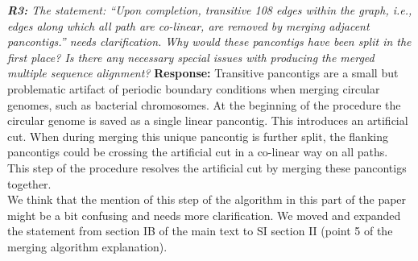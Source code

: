 \documentclass[aps,rmp,onecolumn]{revtex4-1}
\newcommand{\Marco}[1]{{\color{orange}Marco: #1}}
\newcommand{\Liam}[1]{{\color{teal}Liam: #1}}
\newcommand{\reviewer}[2]{{\it \textbf{#1:} #2\vskip 5mm}}
\newcommand{\response}[1]{{{\color{response}\textbf{Response:} #1}}\vskip 5mm}
\newcommand{\SIalgo}{II}
\begin{document}
\reviewer{R3}{The statement: ``Upon completion, transitive 108 edges within the graph, i.e., edges along which all path are co-linear, are removed by merging adjacent pancontigs.'' needs clarification. Why would these pancontigs have been split in the first place? Is there any necessary special issues with producing the merged multiple sequence alignment?}
\response{Transitive pancontigs are a small but problematic artifact of periodic boundary conditions when merging circular genomes, such as bacterial chromosomes. At the beginning of the procedure the circular genome is saved as a single linear pancontig. This introduces an artificial cut. When during merging this unique pancontig is further split, the flanking pancontigs could be crossing the artificial cut in a co-linear way on all paths. This step of the procedure resolves the artificial cut by merging these pancontigs together.\\
      We think that the mention of this step of the algorithm in this part of the paper might be a bit confusing and needs more clarification. We moved and expanded the statement from section IB of the main text to SI section {\SIalgo} (point 5 of the merging algorithm explanation).}
\end{document}
